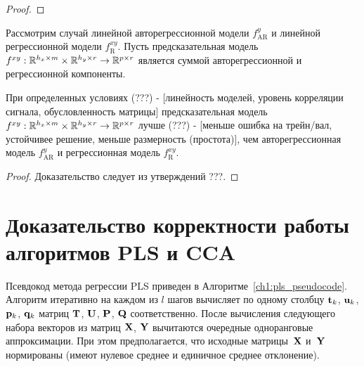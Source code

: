 \begin{statement}
	
\end{statement}

\begin{proof}

\end{proof}

Рассмотрим случай линейной авторегрессионной модели $f_{\text{AR}}^y$ и линейной регрессионной модели $f_{\text{R}}^{xy}$. Пусть предсказательная модель $f^{xy}: \mathbb{R}^{h_x \times m} \times \mathbb{R}^{h_y \times r} \rightarrow \mathbb{R}^{p \times r}$ является суммой авторегрессионной и регрессионной компоненты.

\begin{theorem}
	При определенных условиях (???) - [линейность моделей, уровень корреляции сигнала, обусловленность матрицы] предсказательная модель $f^{xy}: \mathbb{R}^{h_x \times m} \times \mathbb{R}^{h_y \times r} \rightarrow \mathbb{R}^{p \times r}$ лучше (???) - [меньше ошибка на трейн/вал, устойчивее решение, меньше размерность (простота)], чем авторегрессионная модель $f_{\text{AR}}^y$ и регрессионная модель $f_{\text{R}}^{xy}$.
\end{theorem}

\begin{proof}
	 Доказательство следует из утверждений ???.
\end{proof}


\section{Доказательство корректности работы алгоритмов PLS и CCA}

Псевдокод метода регрессии PLS приведен в Алгоритме~\ref{ch1:pls_pseudocode}.
Алгоритм итеративно на каждом из $l$ шагов вычисляет по одному столбцу $\mathbf{t}_k$, $\mathbf{u}_k$, $\mathbf{p}_k$, $\mathbf{q}_k$ матриц $\mathbf{T}$, $\mathbf{U}$, $\mathbf{P}$, $\mathbf{Q}$ соответственно. 
После вычисления следующего набора векторов из матриц $\mathbf{X}$, $\mathbf{Y}$ вычитаются очередные одноранговые аппроксимации. 
При этом предполагается, что исходные матрицы~$\mathbf{X}$ и~$\mathbf{Y}$ нормированы (имеют нулевое среднее и единичное среднее отклонение).

